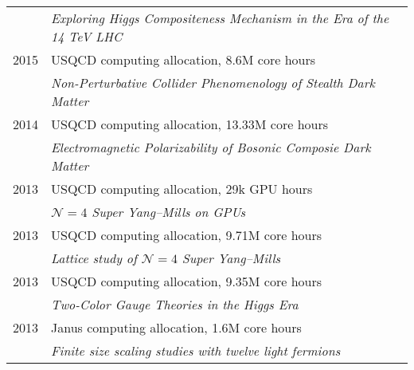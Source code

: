 \begin{spacelist}
\begin{tabular}[t]{cl}
           & \textit{Exploring Higgs Compositeness Mechanism in the Era of the 14 TeV LHC}                                                                     \\[6 pt]
      2015 & USQCD computing allocation, 8.6M core hours                                                                                                       \\ %
           & \textit{Non-Perturbative Collider Phenomenology of Stealth Dark Matter}                                                                           \\[6 pt]
      2014 & USQCD computing allocation, 13.33M core hours                                                                                                     \\ %
           & \textit{Electromagnetic Polarizability of Bosonic Composie Dark Matter}                                                                           \\[6 pt]
      2013 & USQCD computing allocation, 29k GPU hours                                                                                                         \\ %
           & \textit{$\mathcal N = 4$ Super Yang--Mills on GPUs}                                                                                               \\[6 pt]
      2013 & USQCD computing allocation, 9.71M core hours                                                                                                      \\ %
           & \textit{Lattice study of $\mathcal N = 4$ Super Yang--Mills}                                                                                      \\[6 pt]
      2013 & USQCD computing allocation, 9.35M core hours                                                                                                      \\ %
           & \textit{Two-Color Gauge Theories in the Higgs Era}                                                                                                \\[6 pt]
      2013 & Janus computing allocation, 1.6M core hours                                                                                                       \\ %
           & \textit{Finite size scaling studies with twelve light fermions}                                                                                   \\[6 pt]

\end{tabular}
\end{spacelist}
